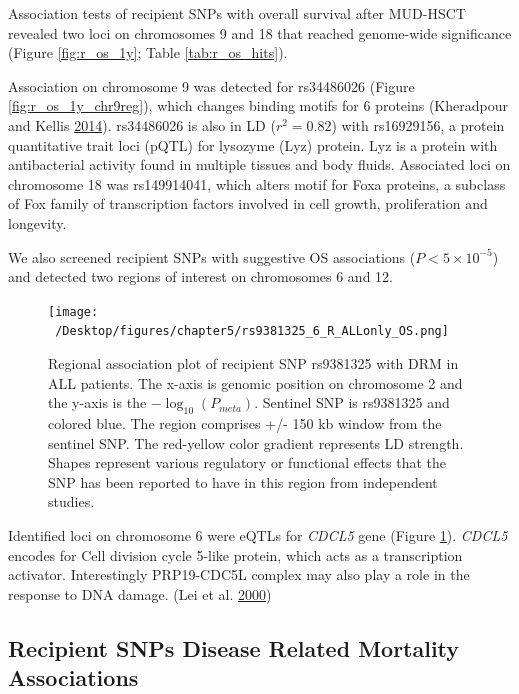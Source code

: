 \documentclass[]{DissertateOSU}
\begin{document}
Association tests of recipient SNPs with overall survival after MUD-HSCT
revealed two loci on chromosomes 9 and 18 that reached genome-wide
significance (Figure \ref{fig:r_os_1y}; Table \ref{tab:r_os_hits}).

Association on chromosome 9 was detected for rs34486026 (Figure
\ref{fig:r_os_1y_chr9reg}), which changes binding motifs for 6 proteins
(Kheradpour and Kellis \protect\hyperlink{ref-motifs_2014}{2014}).
rs34486026 is also in LD (\(r^2=0.82\)) with rs16929156, a protein
quantitative trait loci (pQTL) for lysozyme (Lyz) protein. Lyz is a
protein with antibacterial activity found in multiple tissues and body
fluids. Associated loci on chromosome 18 was rs149914041, which alters
motif for Foxa proteins, a subclass of Fox family of transcription
factors involved in cell growth, proliferation and longevity.

We also screened recipient SNPs with suggestive OS associations
(\(P < 5 \times 10^{-5}\)) and detected two regions of interest on
chromosomes 6 and 12.

\begin{figure}
    \centering
    \texttt{[image: ~/Desktop/figures/chapter5/rs9381325\_6\_R\_ALLonly\_OS.png]}
    \caption[Regional association plot of recipient SNP rs9381325 with DRM in ALL patients.]{Regional association plot of recipient SNP rs9381325 with DRM in ALL patients. The x-axis is genomic position on chromosome 2 and the y-axis is the $-\log_{10}(P_{meta})$. Sentinel SNP is rs9381325 and colored blue. The region comprises +/- 150 kb window from the sentinel SNP. The red-yellow color gradient represents LD strength. Shapes represent various regulatory or functional effects that the SNP has been reported to have in this region from independent studies.}
    \label{fig:r_os_1y_chr6}  
\end{figure}

Identified loci on chromosome 6 were eQTLs for \emph{CDCL5} gene (Figure
\ref{fig:r_os_1y_chr6}). \emph{CDCL5} encodes for Cell division cycle
5-like protein, which acts as a transcription activator. Interestingly
PRP19-CDC5L complex may also play a role in the response to DNA damage.
(Lei et al. \protect\hyperlink{ref-Lei_2000}{2000})

\subsection{Recipient SNPs Disease Related Mortality
Associations}\label{recipient-snps-disease-related-mortality-associations}
\end{document}
